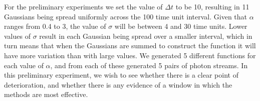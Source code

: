 \documentclass[a4paper,11pt]{article}
\begin{document}
    For the preliminary experiments we set the value of $\Delta t$ to be 10,
    resulting in 11 Gaussians being spread uniformly across the 100 time unit
    interval. Given that $\alpha$ ranges from 0.4 to 3, the value of $\sigma$
    will be between 4 and 30 time units. Lower values of $\sigma$ result in each
    Gaussian being spread over a smaller interval, which in turn means that when
    the Gaussians are summed to construct the function it will have more
    variation than with large values. We generated 5 different functions for
    each value of $\alpha$, and from each of these generated 5 pairs of photon
    streams. In this preliminary experiment, we wish to see whether there is a
    clear point of deterioration, and whether there is any evidence of a window
    in which the methods are most effective.
    \begin{table}[h!]
    \centerline{
    \quad
    } %
    \begin{center}
    \end{center}
    \label{tbl:trest}
    \caption{Error on method combinations for 3 different $\alpha$ values. (a)
    and (b) are points at which there is a comparatively large error. (c) is
    provided for comparison. ($\mu_{\text{err}}\pm\sigma$)}
    \end{table}
\end{document}
